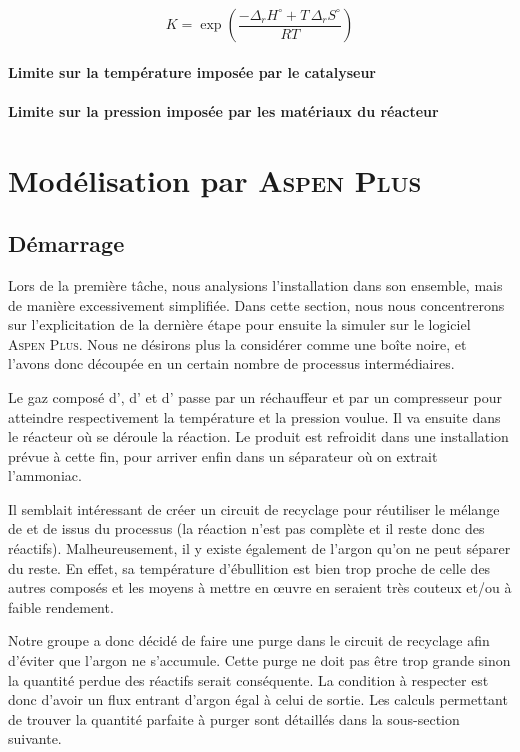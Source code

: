 \documentclass[a4paper, oneside, 12pt]{article}
\begin{document}
\[
K = \exp{\left( \frac{- \Delta_r H^{\circ} + T \, \Delta_r S^{\circ}}{R T}\right)}
\]

\paragraph{Limite sur la température imposée par le catalyseur}

\paragraph{Limite sur la pression imposée par les matériaux du réacteur}

\section{Modélisation par \textsc{Aspen Plus}}
\subsection{Démarrage}

Lors de la première tâche, nous analysions l'installation dans son ensemble, 
mais de manière excessivement simplifiée. 
Dans cette section, nous nous concentrerons sur l'explicitation de la dernière étape 
pour ensuite la simuler sur le logiciel \textsc{Aspen Plus}. 
Nous ne désirons plus la considérer comme une boîte noire, et l'avons donc découpée 
en un certain nombre de processus intermédiaires. 

Le gaz composé d', d' et d' passe par un réchauffeur 
et par un compresseur pour atteindre respectivement la température et la pression voulue. 
Il va ensuite dans le réacteur où se déroule la réaction.
Le produit est refroidit dans une installation prévue à cette fin, 
pour arriver enfin dans un séparateur où on extrait l'ammoniac.

Il semblait intéressant de créer un circuit de recyclage pour réutiliser 
le mélange de  et de  issus du processus (la réaction n'est pas complète 
et il reste donc des réactifs). Malheureusement, il y existe également de l'argon 
qu'on ne peut séparer du reste. En effet, sa température d'ébullition est bien trop 
proche de celle des autres composés et les moyens à mettre en œuvre en seraient 
très couteux et/ou à faible rendement.

Notre groupe a donc décidé de faire une purge dans le circuit de recyclage afin d'éviter que l'argon ne s'accumule. Cette purge ne doit pas être trop grande sinon la quantité perdue des réactifs serait conséquente. 
La condition à respecter est donc d'avoir un flux entrant d'argon égal à celui de sortie. 
Les calculs permettant de trouver la quantité parfaite à purger 
sont détaillés dans la sous-section suivante.
\end{document}
